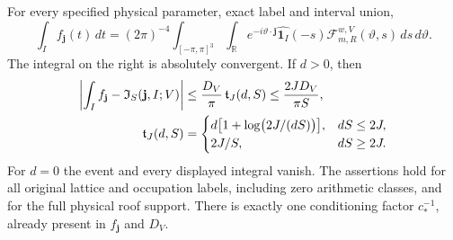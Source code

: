 \begin{theorem}
\label{thm:ui-inversion}
For every specified physical parameter, exact label and interval union,
\begin{equation}\label{eq:ui-inversion}
 \int_I f_{\mathbf j}(t)\,dt
  =(2\pi)^{-4}\int_{[-\pi,\pi]^3}\int_{\mathbb R}
      e^{-i\vartheta\cdot\mathbf j}\widehat{\mathbf1_I}(-s)
            \mathcal F_{m,R}^{w,V}(\vartheta,s)\,ds\,d\vartheta.
\end{equation}
The integral on the right is absolutely convergent.  If $d>0$, then
\begin{align}
 \left|\int_I f_{\mathbf j}-\mathfrak I_S(\mathbf j,I;V)\right|
 &\le {D_V\over\pi}\,\mathfrak t_J(d,S)
 \le {2JD_V\over\pi S},                         \label{eq:ui-tail}\\
 \mathfrak t_J(d,S)
 &=\begin{cases}
 d\bigl[1+\log\bigl(2J/(dS)\bigr)\bigr],&dS\le2J,\\
 2J/S,&dS\ge2J.
 \end{cases}                                    \label{eq:ui-tail-function}
\end{align}
For $d=0$ the event and every displayed integral vanish.  The assertions
hold for all original lattice and occupation labels, including zero
arithmetic classes, and for the full physical roof support.  There is
exactly one conditioning factor $c_*^{-1}$, already present in
$f_{\mathbf j}$ and $D_V$.
\end{theorem}
